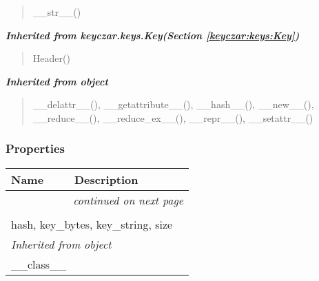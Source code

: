 \begin{quote}
\_\_str\_\_()
\end{quote}

\large{\textbf{\textit{Inherited from keyczar.keys.Key\textit{(Section \ref{keyczar:keys:Key})}}}}

\begin{quote}
Header()
\end{quote}

\large{\textbf{\textit{Inherited from object}}}

\begin{quote}
\_\_delattr\_\_(), \_\_getattribute\_\_(), \_\_hash\_\_(), \_\_new\_\_(), \_\_reduce\_\_(), \_\_reduce\_ex\_\_(), \_\_repr\_\_(), \_\_setattr\_\_()
\end{quote}


  \subsubsection{Properties}

    \vspace{-1cm}
\hspace{\varindent}\begin{longtable}{|p{\varnamewidth}|p{\vardescrwidth}|l}
\cline{1-2}
\cline{1-2} \centering \textbf{Name} & \centering \textbf{Description}& \\
\cline{1-2}
\endhead\cline{1-2}\multicolumn{3}{r}{\small\textit{continued on next page}}\\\endfoot\cline{1-2}
\endlastfoot\multicolumn{2}{|l|}{\textit{Inherited from keyczar.keys.Key \textit{(Section \ref{keyczar:keys:Key})}}}\\
\multicolumn{2}{|p{\varwidth}|}{\raggedright hash, key\_bytes, key\_string, size}\\
\cline{1-2}
\multicolumn{2}{|l|}{\textit{Inherited from object}}\\
\multicolumn{2}{|p{\varwidth}|}{\raggedright \_\_class\_\_}\\
\cline{1-2}
\end{longtable}



